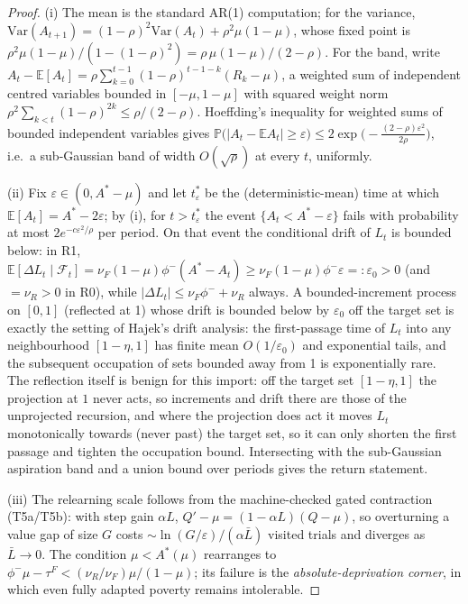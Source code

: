 \documentclass[11pt]{article}
\newcommand{\E}{\mathbb{E}}
\newcommand{\Prob}{\mathbb{P}}
\newcommand{\1}{\mathbf{1}}
\newcommand{\Astar}{A^{*}}
\begin{document}
\begin{proof}
(i) The mean is the standard AR(1) computation; for the variance,
$\mathrm{Var}(A_{t+1})=(1-\rho)^2\mathrm{Var}(A_t)+\rho^2\mu(1-\mu)$, whose fixed point is
$\rho^2\mu(1-\mu)/(1-(1-\rho)^2)=\rho\,\mu(1-\mu)/(2-\rho)$. For the band, write
$A_t-\E[A_t]=\rho\sum_{k=0}^{t-1}(1-\rho)^{t-1-k}(R_k-\mu)$, a weighted sum of independent
centred variables bounded in $[-\mu,1-\mu]$ with squared weight norm
$\rho^2\sum_{k<t}(1-\rho)^{2k}\le\rho/(2-\rho)$. Hoeffding's inequality for weighted sums of
bounded independent variables\cite{BLM2013} gives
$\Prob\big(|A_t-\E A_t|\ge\varepsilon\big)\le2\exp\!\big(-\tfrac{(2-\rho)\varepsilon^2}{2\rho}\big)$,
i.e.\ a sub-Gaussian band of width $O(\sqrt\rho)$ at every $t$, uniformly.

(ii) Fix $\varepsilon\in(0,\Astar-\mu)$ and let $t^\ast_\varepsilon$ be the (deterministic-mean)
time at which $\E[A_t]=\Astar-2\varepsilon$; by (i), for $t>t^\ast_\varepsilon$ the event
$\{A_t<\Astar-\varepsilon\}$ fails with probability at most $2e^{-c\varepsilon^2/\rho}$ per
period. On that event the conditional drift of $L_t$ is bounded below: in R1,
$\E[\Delta L_t\mid\mathcal F_t]=\nu_F(1-\mu)\phi^-(\Astar-A_t)\ge\nu_F(1-\mu)\phi^-\varepsilon
=:\varepsilon_0>0$ (and $=\nu_R>0$ in R0), while $|\Delta L_t|\le\nu_F\phi^-+\nu_R$ always.
A bounded-increment process on $[0,1]$ (reflected at 1) whose drift is bounded below by
$\varepsilon_0$ off the target set is exactly the setting of Hajek's drift
analysis\cite{Hajek1982}: the first-passage time of $L_t$ into any neighbourhood
$[1-\eta,1]$ has finite mean $O(1/\varepsilon_0)$ and exponential tails, and the subsequent
occupation of sets bounded away from 1 is exponentially rare. The reflection itself is
benign for this import: off the target set $[1-\eta,1]$ the projection at $1$ never acts,
so increments and drift there are those of the unprojected recursion, and where the
projection does act it moves $L_t$ monotonically towards (never past) the target set, so
it can only shorten the first passage and tighten the occupation bound. Intersecting with the
sub-Gaussian aspiration band and a union bound over periods gives the return statement.

(iii) The relearning scale follows from the machine-checked gated contraction (T5a/T5b):
with step gain $\alpha L$, $Q'-\mu=(1-\alpha L)(Q-\mu)$, so overturning a value gap of size
$G$ costs $\sim\ln(G/\varepsilon)/(\alpha\bar L)$ visited trials and diverges as $\bar L\to0$.
The condition $\mu<\Astar(\mu)$ rearranges to $\phi^-\mu-\tau^F<(\nu_R/\nu_F)\mu/(1-\mu)$;
its failure is the \emph{absolute-deprivation corner}, in which even fully adapted poverty
remains intolerable.
\end{proof}
\end{document}
